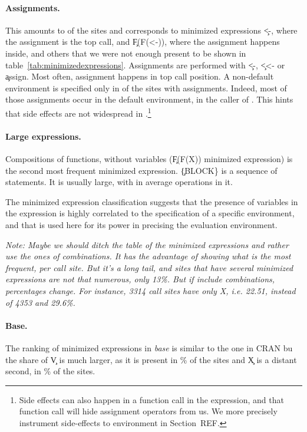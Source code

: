 \documentclass[screen,acmsmall]{acmart}
\newcommand{\NOTE}[1]{{\it Note: #1}\xspace}
\begin{document}
\paragraph{Assignments.} This amounts to \packageAssignSitesPercent of the sites and corresponds to minimized expressions \c{<-}, where the assignment is the top call, and \c{F(F(<-))}, where the assignment happens inside, and others that we were not enough present to be shown in table~\ref{tab:minimizedexpressions}.  Assignments are performed with \c{<-}, \c{<<-} or \c{assign}. Most often, assignment happens in top call position. A non-default environment is specified only in \packageNonDefaultEnvirAssignSitesPercent of the sites with assignments. Indeed, most of those assignments occur in the default environment, \ie in the caller of \eval. This hints that side effects are not widespread in \eval.\footnote{Side effects can also happen in a function call in the \eval expression, and that function call will hide assignment operators from us. We more precisely instrument side-effects to environment in Section~REF.}

\paragraph{Large expressions.}  Compositions of functions, without variables (\c{F(F(X))} minimized expression) is the second most frequent minimized expression. \c{\{BLOCK\}} is a sequence of statements. It is usually large, with in average \packageMinimizedoperationsjRnd operations in it.



The minimized expression classification suggests that the presence of variables in the expression is highly correlated to the specification of a specific environment, and that \eval is used here for its power in precising the evaluation environment.





\NOTE{Maybe we should ditch the table of the minimized expressions and rather use the ones of combinations. It has the advantage of showing what is the most frequent, per call site. But it's a long tail, and sites that have several minimized expressions are not that numerous, only 13\%. But if include combinations, percentages change. For instance, 3314 call sites have only X, i.e. 22.51, instead of 4353 and 29.6\%. }


\paragraph{Base.} The ranking of minimized expressions in \emph{base} is similar to the one in CRAN bu the share of \c{V} is much larger, as it is present in \baseMinimizedpropsitesa\% of the sites and \c{X} is a distant second, in \baseMinimizedpropsitesb\% of the sites.
\end{document}
